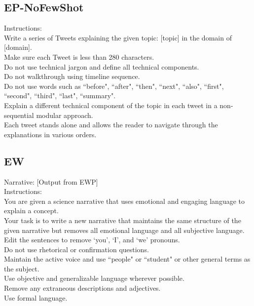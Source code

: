 \subsection{EP-NoFewShot}
\label{EP_prompt}

Instructions:\\
Write a series of Tweets explaining the given topic: [topic] in the domain of [domain].\\
Make sure each Tweet is less than 280 characters.\\

\noindent Do not use technical jargon and define all technical components.\\
Do not walkthrough using timeline sequence. \\
Do not use words such as ``before", ``after", ``then", ``next", ``also", ``first", ``second", ``third", ``last", ``summary".\\
Explain a different technical component of the topic in each tweet in a non-sequential modular approach.\\
Each tweet stands alone and allows the reader to navigate through the explanations in various orders.\\


\subsection{EW}
\label{EW_prompt}

Narrative: [Output from EWP]\\

\noindent Instructions:\\
You are given a science narrative that uses emotional and engaging language to explain a concept.\\
Your task is to write a new narrative that maintains the same structure of the given narrative but removes all emotional language and all subjective language.\\
Edit the sentences to remove `you', `I', and `we' pronouns. \\
Do not use rhetorical or confirmation questions.\\
Maintain the active voice and use ``people" or ``student" or other general terms as the subject.\\
Use objective and generalizable language wherever possible.\\
Remove any extraneous descriptions and adjectives.\\
Use formal language.\\